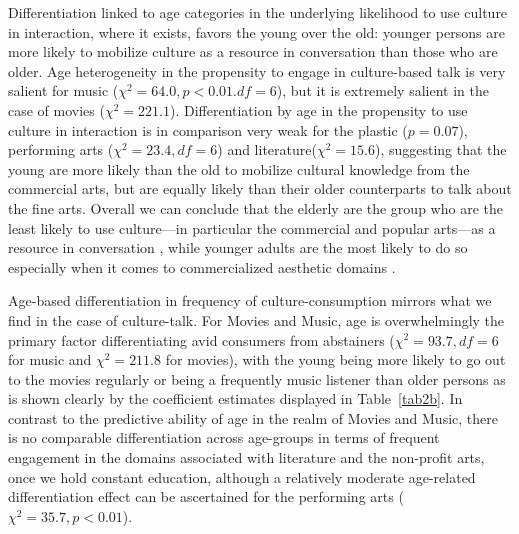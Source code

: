 \documentclass[11pt]{article}
\begin{document}
Differentiation linked to age categories in the underlying likelihood to use culture in interaction, where it exists, favors the young over the old:   younger persons are more likely to mobilize culture as a resource in conversation than those who are older. Age heterogeneity in the propensity to engage in culture-based talk is very salient for music ($\chi^{2}= 64.0, p<0.01. df=6$), but it is extremely salient in the case of movies ($\chi^{2}=221.1$). Differentiation by age in the propensity to use culture in interaction is in comparison very weak for the plastic ($p=0.07$), performing arts ($\chi^{2}=23.4, df=6$) and literature($\chi^{2}=15.6$), suggesting that the young are more likely than the old to mobilize cultural knowledge from the commercial arts, but are equally likely than their older counterparts to talk about the fine arts.  Overall we can conclude that the elderly are the group who are the least likely to use culture---in particular the commercial and popular arts---as a resource in conversation \citep{dimaggio87}, while younger adults are the most likely to do so especially when it comes to commercialized aesthetic domains \citep{frith98}.

Age-based differentiation in frequency of culture-consumption mirrors what we find in the case of culture-talk.  For Movies and Music, age is overwhelmingly the primary factor differentiating avid consumers from abstainers ($\chi^{2}=93.7, df=6$ for music and $\chi^{2}=211.8$ for movies), with the young being more likely to go out to the movies regularly or being a frequently music listener than older persons as is shown clearly by the coefficient estimates displayed in Table~\ref{tab2b}.  In contrast to the predictive ability of age in the realm of Movies and Music, there is no comparable differentiation across age-groups in terms of frequent engagement in the domains associated with literature and the non-profit arts, once we hold constant education, although a relatively moderate age-related differentiation effect can be ascertained for the performing arts ($\chi^{2}=35.7, p<0.01$). 
\end{document}
